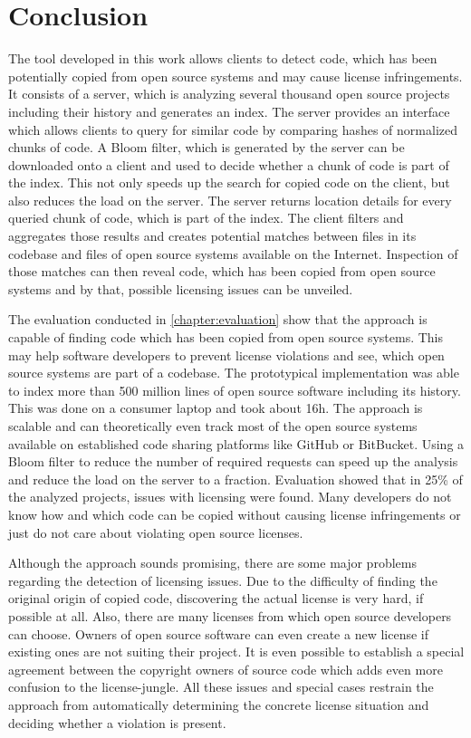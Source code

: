 
\chapter{Conclusion}\label{chapter:conclusion}
The tool developed in this work allows clients to detect code, which has been potentially copied from open source systems and may cause license infringements.
It consists of a server, which is analyzing several thousand open source projects including their history and generates an index.
The server provides an interface which allows clients to query for similar code by comparing hashes of normalized chunks of code.
A Bloom filter, which is generated by the server can be downloaded onto a client and used to decide whether a chunk of code is part of the index.
This not only speeds up the search for copied code on the client, but also reduces the load on the server.
The server returns location details for every queried chunk of code, which is part of the index. 
The client filters and aggregates those results and creates potential matches between files in its codebase and files of open source systems available on the Internet.
Inspection of those matches can then reveal code, which has been copied from open source systems and by that, possible licensing issues can be unveiled.

The evaluation conducted in \autoref{chapter:evaluation} show that the approach is capable of finding code which has been copied from open source systems.
This may help software developers to prevent license violations and see, which open source systems are part of a codebase.
The prototypical implementation was able to index more than 500 million lines of open source software including its history.
This was done on a consumer laptop and took about 16h.
The approach is scalable and can theoretically even track most of the open source systems available on established code sharing platforms like GitHub or BitBucket.
Using a Bloom filter to reduce the number of required requests can speed up the analysis and reduce the load on the server to a fraction.
Evaluation showed that in 25\% of the analyzed projects, issues with licensing were found.
Many developers do not know how and which code can be copied without causing license infringements or just do not care about violating open source licenses.

Although the approach sounds promising, there are some major problems regarding the detection of licensing issues.
Due to the difficulty of finding the original origin of copied code, discovering the actual license is very hard, if possible at all.
Also, there are many licenses from which open source developers can choose.
Owners of open source software can even create a new license if existing ones are not suiting their project.
It is even possible to establish a special agreement between the copyright owners of source code which adds even more confusion to the license-jungle.
All these issues and special cases restrain the approach from automatically determining the concrete license situation and deciding whether a violation is present.

